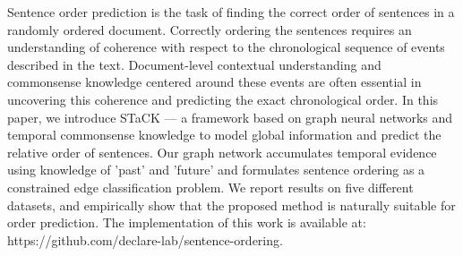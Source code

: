 Sentence order prediction is the task of finding the correct order of sentences in a randomly ordered document. Correctly ordering the sentences requires an understanding of coherence with respect to the chronological sequence of events described in the text. Document-level contextual understanding and commonsense knowledge centered around these events are often essential in uncovering this coherence and predicting the exact chronological order.  In this paper, we introduce STaCK --- a framework based on graph neural networks and temporal commonsense knowledge to model global information and predict the relative order of sentences. Our graph network accumulates temporal evidence using knowledge of 'past' and 'future' and formulates sentence ordering as a constrained edge classification problem. We report results on five different datasets, and empirically show that the proposed method is naturally suitable for order prediction. The implementation of this work is available at: https://github.com/declare-lab/sentence-ordering.
